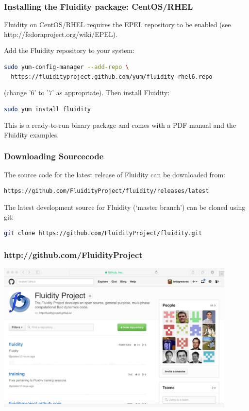 \documentclass[12pt]{beamer}
\begin{document}
\begin{frame}[fragile]
        \frametitle{Installing the Fluidity package: CentOS/RHEL}
\lstset{language=bash}
Fluidity on CentOS/RHEL requires the EPEL repository to be enabled 
(see http://fedoraproject.org/wiki/EPEL). 

\hspace{10mm}

Add the Fluidity repository to your system:
\begin{lstlisting}[language=bash,basicstyle=\ttfamily\scriptsize]
sudo yum-config-manager --add-repo \
  https://fluidityproject.github.com/yum/fluidity-rhel6.repo
\end{lstlisting}

(change '6' to '7' as appropriate). Then install Fluidity:
\begin{lstlisting}[language=bash,basicstyle=\ttfamily\scriptsize]
sudo yum install fluidity
\end{lstlisting}
This is a ready-to-run binary package and comes with a PDF manual and the
Fluidity examples.
\end{frame}

\begin{frame}[fragile]
        \frametitle{Downloading Sourcecode}
\lstset{language=bash}
The source code for the latest release of Fluidity can be downloaded from:
\begin{lstlisting}[language=bash,basicstyle=\ttfamily\scriptsize]
https://github.com/FluidityProject/fluidity/releases/latest
\end{lstlisting}    
The latest development source for Fluidity (`master branch') can be cloned using git:
\begin{lstlisting}[language=bash,basicstyle=\ttfamily\scriptsize]
git clone https://github.com/FluidityProject/fluidity.git
\end{lstlisting}    
\end{frame}

\begin{frame}
        \frametitle{http://github.com/FluidityProject}
\begin{center}
    \includegraphics[width=0.9\textwidth]{images/github-home.png}
\end{center}
\end{frame}
\end{document}
